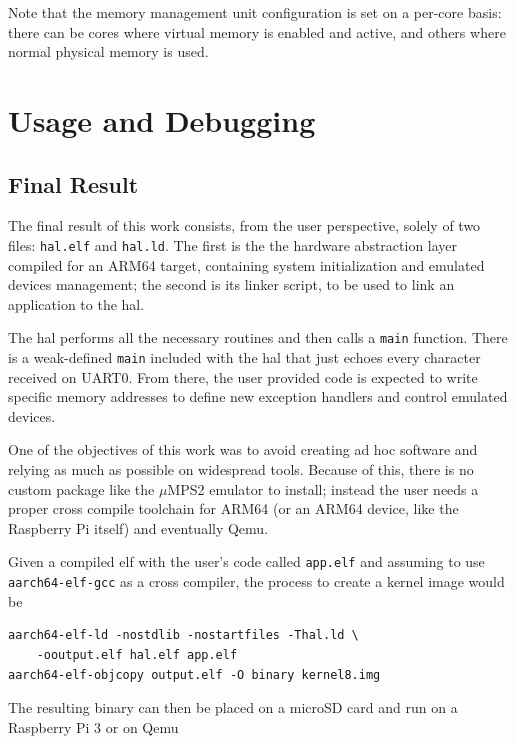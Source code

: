\documentclass[12pt,a4paper,openright,twoside]{report}
\begin{document}
Note that the memory management unit configuration is set on a per-core basis:
there can be cores where virtual memory is enabled and active, and others where
normal physical memory is used.


\clearpage{\pagestyle{empty}\cleardoublepage}
\chapter{Usage and Debugging}
\section{Final Result}
The final result of this work consists, from the user perspective, solely of 
two files: {\tt hal.elf} and {\tt hal.ld}.
The first is the the hardware abstraction layer compiled for an ARM64 target, 
containing system initialization and emulated devices management; the second is 
its linker script, to be used to link an application to the hal.

The hal performs all the necessary routines and then calls a {\tt main} function.
There is a weak-defined {\tt main} included with the hal that just echoes every
character received on UART0.
From there, the user provided code is expected to write specific memory addresses
to define new exception handlers and control emulated devices. 

One of the objectives of this work was to avoid creating ad hoc software and
relying as much as possible on widespread tools. Because of this, there is no
custom package like the $\mu$MPS2 emulator to install; instead the user needs
a proper cross compile toolchain for ARM64 (or an ARM64 device, like the Raspberry
Pi itself) and eventually Qemu.

Given a compiled elf with the user's code called {\tt app.elf} and assuming to
use {\tt aarch64-elf-gcc} as a cross compiler, the process to create a kernel image
would be 
\begin{lstlisting}
aarch64-elf-ld -nostdlib -nostartfiles -Thal.ld \
    -ooutput.elf hal.elf app.elf                                                                                                                                    
aarch64-elf-objcopy output.elf -O binary kernel8.img
\end{lstlisting}
The resulting binary can then be placed on a microSD card and run on a Raspberry Pi 3
or on Qemu
\end{document}
